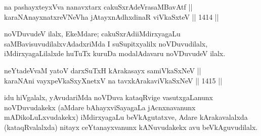  
\begin{shl}
na pashayxteyxVva nanavxtarx cakuSxrAdeVrasaMBavAtf || \\
karaNAnayxnatxreVNeVha jAtayxnAdhxdinaR viVkaSxteV \hfill || 1414 ||  
\end{shl}
 
\begin{artha}
noVDuvudeV ilalx, EkeMdare; cakuSxrAdiiMdirxyagaLu saMBavisuvudilalxvAdadxriMda I suSupitxyalilx noVDuvudilalx, iMdirxyagaLilalxde huTuTx kuruDa modalAdavaru noVDuvudeV ilalx.
\end{artha}


\begin{shl}
neYtadeVvaM yatoV darxSuTxH kArakasayx samiVkaSxNeV || \\
karaNAni vayxpeVkaSxyXnetxV na tavxkArakaviVkaSxNeV \hfill || 1415 || 
\end{shl}

\begin{artha}
idu hiVgalalx, yAvudariMda noVDuva kataqRvige vasutxgaLanunx noVDuvudakekx (aMdare bAhayxviSayagaLa jAcnxnavanunx mADikoLuLxvudakekx) iMdirxyagaLu beVkAgutatxve, Adare kArakavalalxda (kataqRvalalxda) nitayx ceYtanayxvanunx kANuvudakekx avu beVkAguvudilalx.
\end{artha}
